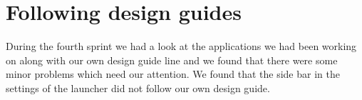 
\section{Following design guides}
\label{sec:following_design_guides}

During the fourth sprint we had a look at the applications we had been working on along with our own design guide line and we found that there were some minor problems which need our attention. We found that the side bar in the settings of the launcher did not follow our own design guide.

